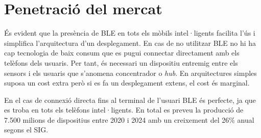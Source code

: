 \section*{Penetració del mercat}

És evident que la presència de BLE en tots els mòbils intel·ligents facilita l'ús i simplifica l'arquitectura d'un desplegament.
En cas de no utilitzar BLE no hi ha cap tecnologia de baix consum que es pugui connectar directament amb els telèfons dels usuaris.
Per tant, és necessari un dispositiu entremig entre els sensors i els usuaris que s'anomena concentrador o \textit{hub}.
En arquitectures simples suposa un cost extra però si es fa un desplegament extens, el cost és marginal.

En el cas de connexió directa fins al terminal de l'usuari BLE és perfecte, ja que es troba en tots els telèfons intel·ligents.
En total es preveu la producció de 7.500 milions de dispositius entre 2020 i 2024 amb un creixement del 26\% anual segons el SIG\cite{Bluetooth_Market_Update_2020}.
